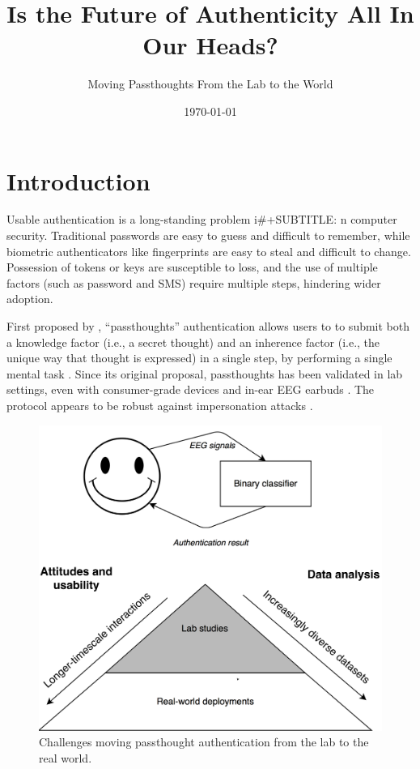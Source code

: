 \documentclass[sigconf]{acmart}
\date{\today}
\title{Is the Future of Authenticity All In Our Heads?}
\begin{document}
\maketitle
\subtitle{Moving Passthoughts From the Lab to the World}

\section{Introduction}
\label{sec:orgbead05d}

Usable authentication is a long-standing problem i\#+SUBTITLE: n computer security.
Traditional passwords are easy to guess and difficult to remember,
while biometric authenticators like fingerprints are easy to steal and difficult to change.
Possession of tokens or keys are susceptible to loss, 
and the use of multiple factors (such as password and SMS) require multiple steps, hindering wider adoption.

First proposed by \cite{Thorpe2005}, ``passthoughts'' authentication allows users to 
to submit both a knowledge factor (i.e., a secret thought) and an inherence factor (i.e., the unique way that thought is expressed)
in a single step, by performing a single mental task \cite{Johnson2014}.
Since its original proposal, passthoughts has been validated in lab settings, even with 
consumer-grade devices \cite{Chuang2013b} and in-ear EEG earbuds \cite{curranpassthoughts}.
The protocol appears to be robust against impersonation attacks \cite{Johnson2014}.


\label{fig:diagram}
\begin{figure}[htbp]
\centering
\includegraphics[width=.9\linewidth]{./figures/passthoughts-diagram.png}
\caption{Challenges moving passthought authentication from the lab to the real world.}
\end{figure}
\end{document}
